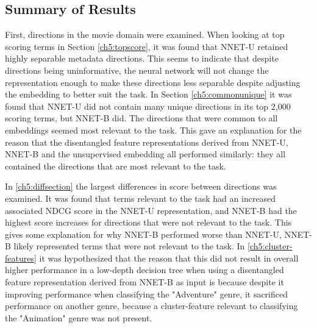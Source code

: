 













\subsection{Summary of Results}

First, directions in the movie domain were examined. When looking at top scoring terms in Section \ref{ch5:topscore}, it was found that NNET-U retained highly separable metadata directions. This seems to indicate that despite directions being uninformative, the neural network will not change the representation enough to make these directions less separable despite adjusting the embedding to better suit the task. In Section \ref{ch5:commonunique} it was found that NNET-U did not contain many unique directions in its top 2,000 scoring terms, but NNET-B did. The directions that were common to all embeddings seemed most relevant to the task. This  gave an explanation for the reason that the disentangled feature representations derived from NNET-U, NNET-B and the unsupervised embedding all performed similarly:  they all contained the directions that are most relevant to the task. 

In \ref{ch5:diffsection} the largest differences in score between directions was examined. It was found that terms relevant to the task had an increased associated NDCG score in the NNET-U representation, and NNET-B had the highest score increases for directions that were not relevant to the task. This gives some explanation for why NNET-B performed worse than NNET-U, NNET-B likely represented terms that were not relevant to the task. In \ref{ch5:cluster-features} it was hypothesized that the reason that this did not result in overall higher performance  in a low-depth decision tree when using a disentangled feature representation derived from NNET-B as input is because despite it improving performance when classifying the "Adventure" genre, it sacrificed performance on another genre, because a cluster-feature relevant to classifying the "Animation" genre was not present. 

